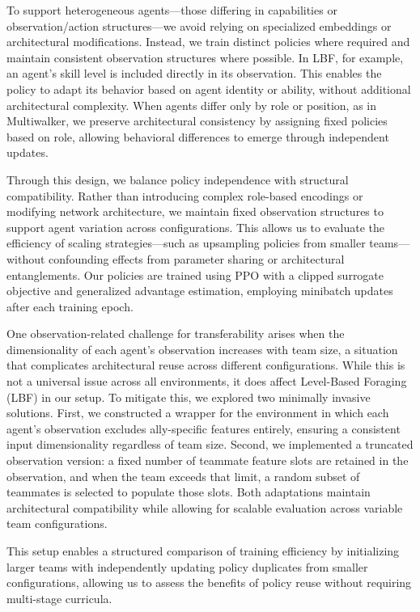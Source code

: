 \documentclass{article}
\begin{document}
To support heterogeneous agents—those differing in capabilities or observation/action 
structures—we avoid relying on specialized embeddings or architectural modifications. 
Instead, we train distinct policies where required and maintain consistent observation 
structures where possible. In LBF, for example, an agent's skill level is included 
directly in its observation. This enables the policy to adapt its behavior based on 
agent identity or ability, without additional architectural complexity. 
When agents differ only by role or position, as in Multiwalker, 
we preserve architectural consistency by assigning fixed policies based on role, 
allowing behavioral differences to emerge through independent updates.

Through this design, we balance policy independence with structural compatibility. 
Rather than introducing complex role-based encodings or modifying network architecture, 
we maintain fixed observation structures to support agent variation across configurations. 
This allows us to evaluate the efficiency of scaling strategies—such as upsampling policies from 
smaller teams—without confounding effects from parameter sharing or architectural entanglements. 
Our policies are trained using PPO with a clipped surrogate objective and generalized 
advantage estimation, employing minibatch updates after each training epoch.

One observation-related challenge for transferability arises when the dimensionality 
of each agent's observation increases with team size, a situation that complicates 
architectural reuse across different configurations. While this is not a universal issue 
across all environments, it does affect Level-Based Foraging (LBF) in our setup. 
To mitigate this, we explored two minimally invasive solutions. First, we constructed a wrapper 
for the environment in which each agent's observation excludes ally-specific features entirely, 
ensuring a consistent input dimensionality regardless of team size. Second, 
we implemented a truncated observation version: a fixed number of teammate feature slots 
are retained in the observation, and when the team exceeds that limit, a random subset of 
teammates is selected to populate those slots. Both adaptations maintain architectural 
compatibility while allowing for scalable evaluation across variable team configurations.

This setup enables a structured comparison of training efficiency by initializing larger teams 
with independently updating policy duplicates from smaller configurations, allowing us to assess 
the benefits of policy reuse without requiring multi-stage curricula.
\end{document}
